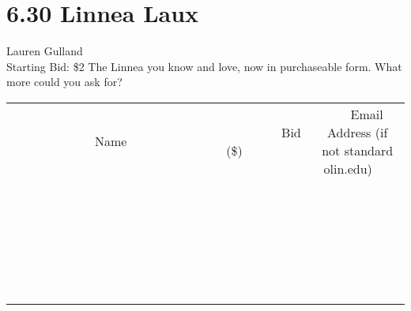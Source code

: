 \documentclass[11pt]{article}
\begin{document}
\section*{6.30 Linnea Laux}
Lauren Gulland
\\
Starting Bid: \$2
\newline
The Linnea you know and love, now in purchaseable form. What more could you ask for?
\\[6ex]
\begin{tabular}{c c c}
~~~~~~~~~~~~~Name~~~~~~~~~~~~~ & ~~~~~~~~~Bid (\$)~~~~~~~~~  & ~~~Email Address (if not standard olin.edu)~~~\\
 & & \\
\hline
 & & \\
\hline
 & & \\
\hline
 & & \\
\hline
 & & \\
\hline
 & & \\
\hline
 & & \\
\hline
 & & \\
\hline
 & & \\
\hline
 & & \\
\hline
 & & \\
\hline
 & & \\
\hline
 & & \\
\hline
 & & \\
\hline
 & & \\
\hline
 & & \\
\hline
 & & \\
\hline
 & & \\
\hline
 & & \\
\hline
 & & \\
\hline
 & & \\
\hline
 & & \\
\hline
 & & \\
\hline
 & & \\
\hline
 & & \\
\hline
 & & \\
\hline
\end{tabular}
\newpage
\end{document}
